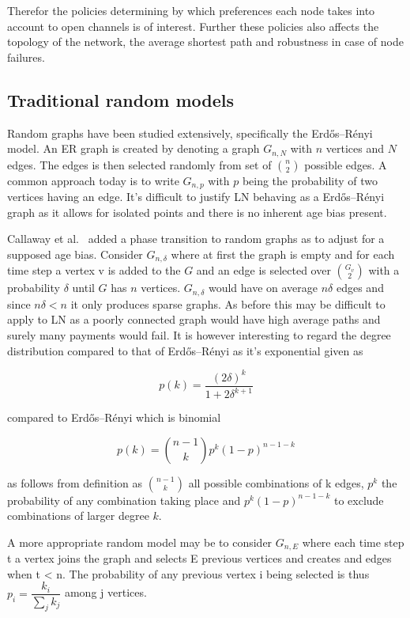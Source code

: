 Therefor the policies determining by which preferences each node takes into account to open channels is of interest. Further these policies also affects the topology of the network, the average shortest path and robustness in case of node failures.

\subsection{Traditional random models}

Random graphs have been studied extensively, specifically the Erdős–Rényi model\cite{erdos:renyi:random:graphs}. An ER graph is created by denoting a graph $G_{n,N}$ with $n$ vertices and $N$ edges. The edges is then selected randomly from set of ${n \choose 2}$ possible edges. A common approach today is to write $G_{n,p}$ with $p$ being the probability of two vertices having an edge. It's difficult to justify LN behaving as a Erdős–Rényi graph as it allows for isolated points and there is no inherent age bias present. 

Callaway et al.~\cite{callaway:hopcraft:randomly:grown:graphs} added a phase transition to random graphs as to adjust for a supposed age bias. Consider $G_{n,\delta}$ where at first the graph is empty and for each time step a vertex v is added to the $G$ and an edge is selected over $G_v \choose 2$ with a probability $\delta$ until $G$ has $n$ vertices. $G_{n,\delta}$ would have on average $n\delta$ edges and since $n\delta < n$ it only produces sparse graphs. As before this may be difficult to apply to LN as a poorly connected graph would have high average paths and surely many payments would fail. It is however interesting to regard the degree distribution compared to that of Erdős–Rényi as it's exponential given as

\[p(k) = \dfrac{(2\delta)^k}{1 + 2\delta^{k+1}} \]

compared to Erdős–Rényi which is binomial

\[p(k) = {n-1 \choose k} p^k(1-p)^{n-1-k} \]

as follows from definition as ${n-1 \choose k}$ all possible combinations of k edges,  $p^k$ the probability of any combination taking place and $p^k(1-p)^{n-1-k}$ to exclude combinations of larger degree $k$.

A more appropriate random model may be to consider $G_{n,E}$ where each time step t a vertex joins the graph and selects E previous vertices and creates and edges when t < n. The probability of any previous vertex i being selected is thus $p_i = \dfrac{k_i}{\sum_{j}^{}k_j}$ among j vertices.

